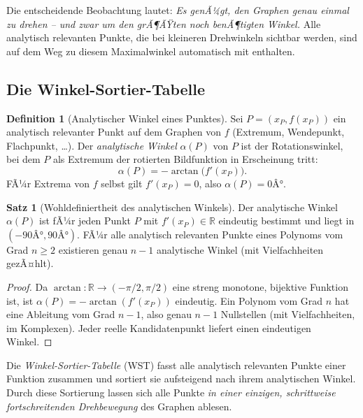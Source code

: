 ﻿\documentclass[12pt, a4paper]{article}
\theoremstyle{definition}
\newtheorem{definition}{Definition}[section]
\newtheorem{satz}{Satz}[section]
\begin{document}
	Die entscheidende Beobachtung lautet: \emph{Es genÃ¼gt, den Graphen genau
		einmal zu drehen -- und zwar um den grÃ¶ÃŸten noch benÃ¶tigten Winkel.}
	Alle analytisch relevanten Punkte, die bei kleineren Drehwinkeln sichtbar
	werden, sind auf dem Weg zu diesem Maximalwinkel automatisch mit enthalten.
	
	\subsection{Die Winkel-Sortier-Tabelle}
	
	\begin{definition}[Analytischer Winkel eines Punktes]
		Sei $P = (x_P, f(x_P))$ ein analytisch relevanter Punkt auf dem Graphen von $f$
		(Extremum, Wendepunkt, Flachpunkt, \ldots). Der \emph{analytische Winkel}
		$\alpha(P)$ von $P$ ist der Rotationswinkel, bei dem $P$ als Extremum der
		rotierten Bildfunktion in Erscheinung tritt:
		\[
		\alpha(P) = -\arctan\!\bigl(f'(x_P)\bigr).
		\]
		FÃ¼r Extrema von $f$ selbst gilt $f'(x_P) = 0$, also $\alpha(P) = 0Â°$.
	\end{definition}
	
	\begin{satz}[Wohldefiniertheit des analytischen Winkels]
		\label{satz:winkelwohldefiniert}
		Der analytische Winkel $\alpha(P)$ ist fÃ¼r jeden Punkt $P$ mit
		$f'(x_P) \in \mathbb{R}$ eindeutig bestimmt und liegt in $(-90Â°, 90Â°)$.
		FÃ¼r alle analytisch relevanten Punkte eines Polynoms vom Grad $n \geq 2$
		existieren genau $n-1$ analytische Winkel (mit Vielfachheiten gezÃ¤hlt).
	\end{satz}
	
	\begin{proof}
		Da $\arctan: \mathbb{R} \to (-\pi/2, \pi/2)$ eine streng monotone, bijektive
		Funktion ist, ist $\alpha(P) = -\arctan(f'(x_P))$ eindeutig. Ein Polynom
		vom Grad $n$ hat eine Ableitung vom Grad $n-1$, also genau $n-1$ Nullstellen
		(mit Vielfachheiten, im Komplexen). Jeder reelle Kandidatenpunkt liefert
		einen eindeutigen Winkel.
	\end{proof}
	
	Die \emph{Winkel-Sortier-Tabelle} (WST) fasst alle analytisch relevanten
	Punkte einer Funktion zusammen und sortiert sie aufsteigend nach ihrem
	analytischen Winkel. Durch diese Sortierung lassen sich alle Punkte
	\emph{in einer einzigen, schrittweise fortschreitenden Drehbewegung}
	des Graphen ablesen.
	
\end{document}
